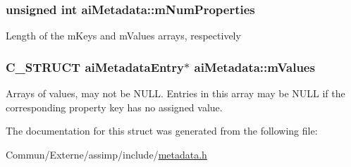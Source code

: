 \subsubsection[{\texorpdfstring{m\+Num\+Properties}{mNumProperties}}]{\setlength{\rightskip}{0pt plus 5cm}unsigned int ai\+Metadata\+::m\+Num\+Properties}\hypertarget{structai_metadata_a32c4587c53dd402a5878ffc94088e528}{}\label{structai_metadata_a32c4587c53dd402a5878ffc94088e528}
Length of the m\+Keys and m\+Values arrays, respectively 
\subsubsection[{\texorpdfstring{m\+Values}{mValues}}]{\setlength{\rightskip}{0pt plus 5cm}C\+\_\+\+S\+T\+R\+U\+CT {\bf ai\+Metadata\+Entry}$\ast$ ai\+Metadata\+::m\+Values}\hypertarget{structai_metadata_a34b515fcb5b806c471d3c6ce7bc76beb}{}\label{structai_metadata_a34b515fcb5b806c471d3c6ce7bc76beb}
Arrays of values, may not be N\+U\+LL. Entries in this array may be N\+U\+LL if the corresponding property key has no assigned value. 

The documentation for this struct was generated from the following file\+:\begin{DoxyCompactItemize}
\item 
Commun/\+Externe/assimp/include/\hyperlink{metadata_8h}{metadata.\+h}\end{DoxyCompactItemize}
